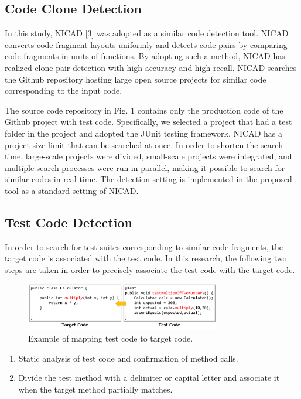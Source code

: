 \documentclass[conference]{IEEEtran}
\begin{document}
\subsection{Code Clone Detection}
In this study, NICAD [3] was adopted as a similar code detection tool. NICAD converts code fragment layouts uniformly and detects code pairs by comparing code fragments in units of functions. By adopting such a method, NICAD has realized clone pair detection with high accuracy and high recall. NICAD searches the Github repository hosting large open source projects for similar code corresponding to the input code.

The source code repository in Fig. 1 contains only the production code of the Github project with test code. Specifically, we selected a project that had a test folder in the project and adopted the JUnit testing framework. NICAD has a project size limit that can be searched at once.  In order to shorten the search time, large-scale projects were divided, small-scale projects were integrated, and multiple search processes were run in parallel, making it possible to search for similar codes in real time. The detection setting is implemented in the proposed tool as a standard setting of NICAD.

\subsection{Test Code Detection}
In order to search for test suites corresponding to similar code fragments, the target code is associated with the test code. In this research, the following two steps are taken in order to precisely associate the test code with the target code.

\begin{figure}[htbp]
\centerline{\includegraphics[width=8.5cm]{mapping.pdf}}
\caption{Example of mapping test code to target code.}
\label{fig}
\end{figure}

\begin{enumerate}
\renewcommand{\labelenumi}{(\arabic{enumi})}
\item Static analysis of test code and confirmation of method calls.
\item Divide the test method with a delimiter or capital letter and associate it when the target method partially matches.
\end{enumerate}
\end{document}
